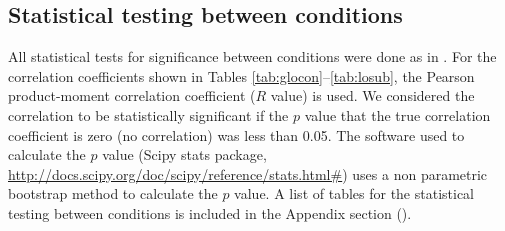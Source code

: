 \subsection{Statistical testing between conditions}
All statistical tests for significance between conditions were done as in . For the correlation coefficients shown in Tables \ref{tab:glocon}--\ref{tab:losub}, the Pearson product-moment correlation coefficient ($R$ value) is used. We considered the correlation to be statistically significant if the $p$ value that the true correlation coefficient is zero (no correlation) was less than 0.05. The software used to calculate the $p$ value (Scipy stats package, \url{http://docs.scipy.org/doc/scipy/reference/stats.html#}) uses a non parametric bootstrap method to calculate the $p$ value. A list of tables for the statistical testing between conditions is included in the Appendix section ().
